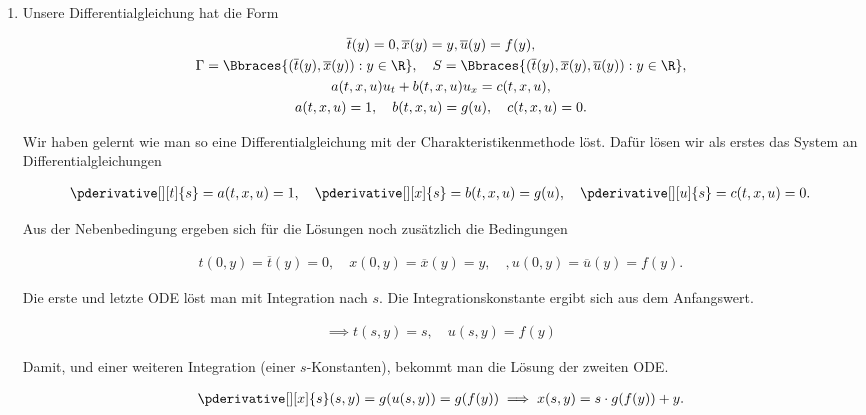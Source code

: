 \begin{solution}

\phantom{}

\begin{enumerate}[label = (\roman*)]

	\item Unsere Differentialgleichung hat die Form 

	\begin{gather*}
		\overline{t}(y) = 0,
		\overline{x}(y) = y,
		\overline{u}(y) = f(y), \\
		\Gamma = \Bbraces
		{
			(\overline{t}(y), \overline{x}(y)):
			y \in \R
		},
		\quad
		S = \Bbraces
		{
			(\overline{t}(y), \overline{x}(y), \overline{u}(y)):
			y \in \R
		}, \\
		a(t, x, u) u_t + b(t, x, u)u_x = c(t, x, u), \\
		a(t,x,u) = 1, \quad b(t,x,u) = g(u), \quad c(t,x,u) = 0.
	\end{gather*}

	Wir haben gelernt wie man so eine Differentialgleichung mit der Charakteristikenmethode löst. Dafür lösen wir als erstes das System an Differentialgleichungen 

	\begin{align*}
		\pderivative[][t]{s} = a(t,x,u) = 1, \quad \pderivative[][x]{s} = b(t,x,u) = g(u), \quad \pderivative[][u]{s} = c(t,x,u) = 0.
	\end{align*}
	
	Aus der Nebenbedingung ergeben sich für die Lösungen noch zusätzlich die Bedingungen 
	
	\begin{align*}
		t(0, y) = \overline{t}(y) = 0,
		\quad
		x(0, y) = \overline{x}(y) = y,
		\quad,
		u(0, y) = \overline{u}(y) = f(y).
	\end{align*}
	
	Die erste und letzte ODE löst man mit Integration nach $s$.
	Die Integrationskonstante ergibt sich aus dem Anfangswert.

	\begin{align*}
		\implies
		t(s,y) = s,
		\quad
		u(s,y) = f(y)
	\end{align*}

	Damit, und einer weiteren Integration (einer $s$-Konstanten), bekommt man die Lösung der zweiten ODE.
	
	\begin{align*}
		\pderivative[][x]{s}(s,y) = g(u(s,y)) = g(f(y))
		\implies
		x(s, y) = s \cdot g(f(y)) + y.
	\end{align*}
	

\end{enumerate}
\end{solution}
